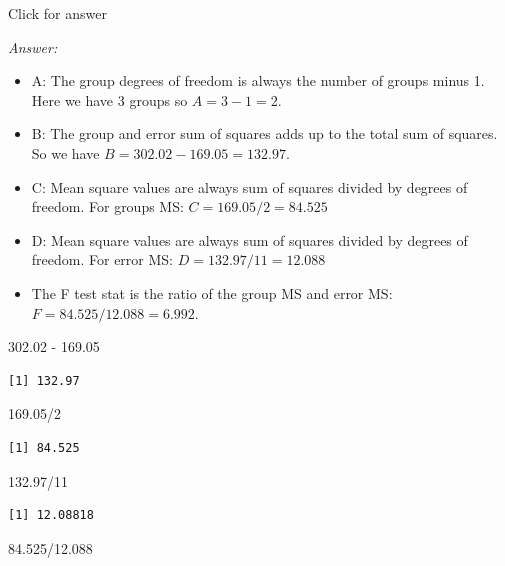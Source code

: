\documentclass[
]{book}
\newenvironment{Shaded}{\begin{snugshade}}{\end{snugshade}}
\newcommand{\DecValTok}[1]{\textcolor[rgb]{0.00,0.00,0.81}{#1}}
\newcommand{\FloatTok}[1]{\textcolor[rgb]{0.00,0.00,0.81}{#1}}
\newcommand{\SpecialCharTok}[1]{\textcolor[rgb]{0.00,0.00,0.00}{#1}}
\begin{document}
Click for answer

\emph{Answer:}

\begin{itemize}
\item
  A: The group degrees of freedom is always the number of groups minus 1. Here we have 3 groups so \(A = 3-1=2\).
\item
  B: The group and error sum of squares adds up to the total sum of squares. So we have \(B = 302.02 - 169.05 = 132.97\).
\item
  C: Mean square values are always sum of squares divided by degrees of freedom. For groups MS: \(C = 169.05/2 = 84.525\)
\item
  D: Mean square values are always sum of squares divided by degrees of freedom. For error MS: \(D = 132.97/11 = 12.088\)
\item
  The F test stat is the ratio of the group MS and error MS: \(F = 84.525/12.088 = 6.992\).
\end{itemize}

\begin{Shaded}
\begin{Highlighting}[]
\FloatTok{302.02} \SpecialCharTok{{-}} \FloatTok{169.05}
\end{Highlighting}
\end{Shaded}

\begin{verbatim}
[1] 132.97
\end{verbatim}

\begin{Shaded}
\begin{Highlighting}[]
\FloatTok{169.05}\SpecialCharTok{/}\DecValTok{2}
\end{Highlighting}
\end{Shaded}

\begin{verbatim}
[1] 84.525
\end{verbatim}

\begin{Shaded}
\begin{Highlighting}[]
\FloatTok{132.97}\SpecialCharTok{/}\DecValTok{11}
\end{Highlighting}
\end{Shaded}

\begin{verbatim}
[1] 12.08818
\end{verbatim}

\begin{Shaded}
\begin{Highlighting}[]
\FloatTok{84.525}\SpecialCharTok{/}\FloatTok{12.088}
\end{Highlighting}
\end{Shaded}
\end{document}
